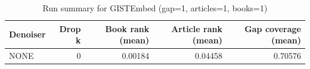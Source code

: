 \begin{table}
\caption{Run summary for GISTEmbed (gap=1, articles=1, books=1)}
\label{tab:summary_gap1_gistembed_a1_b1}
\begin{tabular}{lrrrr}
\toprule
Denoiser & Drop k & Book rank (mean) & Article rank (mean) & Gap coverage (mean) \\
\midrule
NONE & 0 & 0.00184 & 0.04458 & 0.70576 \\
\bottomrule
\end{tabular}
\end{table}